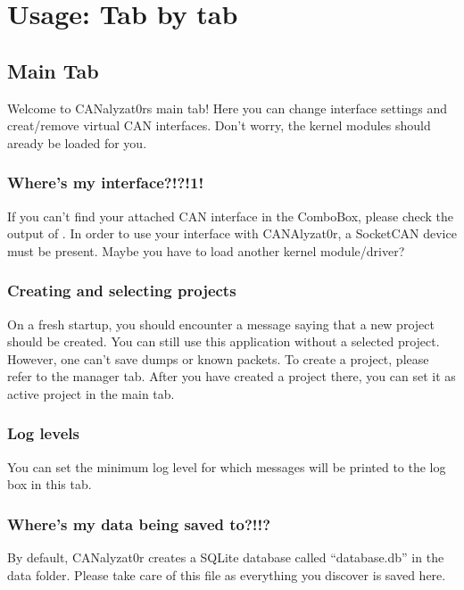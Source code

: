 \documentclass[letterpaper,10pt,english]{sphinxmanual}
\begin{document}
\section{Usage: Tab by tab}
\label{\detokenize{manual:usage-tab-by-tab}}

\subsection{Main Tab}
\label{\detokenize{manual.maintab::doc}}\label{\detokenize{manual.maintab:main-tab}}
Welcome to CANalyzat0rs main tab!
Here you can change interface settings and creat/remove virtual CAN
interfaces. Don’t worry, the kernel modules should aready be loaded for you.


\subsubsection{Where’s my interface?!?!1!}
\label{\detokenize{manual.maintab:where-s-my-interface-1}}
If you can’t find your attached CAN interface in the ComboBox, please
check the output of . In order to use your interface
with CANAlyzat0r, a SocketCAN device must be present. Maybe you have to
load another kernel module/driver?


\subsubsection{Creating and selecting projects}
\label{\detokenize{manual.maintab:creating-and-selecting-projects}}
On a fresh startup, you should encounter a message saying that a new
project should be created. You can still use this application without a
selected project. However, one can’t save dumps or known packets.
To create a project, please refer to the manager tab. After you
have created a project there, you can set it as active project in the
main tab.


\subsubsection{Log levels}
\label{\detokenize{manual.maintab:log-levels}}
You can set the minimum log level for which messages will be printed
to the log box in this tab.


\subsubsection{Where’s my data being saved to?!!?}
\label{\detokenize{manual.maintab:where-s-my-data-being-saved-to}}
By default, CANalyzat0r creates a SQLite database called “database.db”
in the data folder. Please take care of this file as everything you
discover is saved here.
\end{document}
